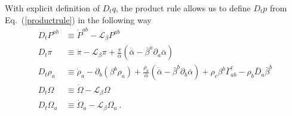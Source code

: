 With explicit definition of $D_{t}q$, the product rule allows us to define $D_{t}p$ from Eq.~(\ref{productrule}) in the following way
\begin{subequations}
\begin{align}
D_{t}P^{ab} & \equiv {\dot P}^{ab} - \mathcal{L}_{\beta}P^{ab}\\
D_{t}\pi & \equiv {\dot \pi} - \mathcal{L}_{\beta}\pi + \frac{\pi}{{\bar \alpha}}\left({\dot {\bar \alpha}} - {\bar \beta}^{a}\partial_{a}{\bar \alpha}\right)\\
D_{t}\rho_{a} & \equiv {\dot \rho}_{a} - \partial_{b}\left(\beta^{b}\rho_{a}\right) + \frac{\rho_{a}}{{\bar \alpha}}\left({\dot {\bar \alpha}} - {\bar \beta}^{b}\partial_{b}{\bar \alpha}\right) + \rho_{c}\beta^{b}{\bar \Gamma}^{c}_{ab} - \rho_{b}{\bar D}_{a}{\bar \beta}^{b}\\
D_{t}\Omega & \equiv {\dot \Omega} - \mathcal{L}_{\beta}\Omega\\
D_{t}\Omega_{a} & \equiv {\dot \Omega}_{a} - \mathcal{L}_{\beta}\Omega_{a} \ .
\end{align}
\end{subequations}

